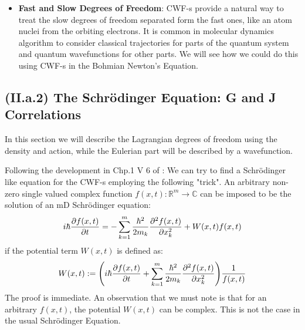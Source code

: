 \documentclass[11pt, a4paper]{article} %
\newcommand{\R}{\mathbb{R}} %
\newcommand{\C}{\mathbb{C}}
\begin{document}
\begin{itemize}
\item {\bf Fast and Slow Degrees of Freedom}: CWF-s provide a natural way to treat the slow degrees of freedom separated form the fast ones, like an atom nuclei from the orbiting electrons. It is common in molecular dynamics algorithm to consider classical trajectories for parts of the quantum system and quantum wavefunctions for other parts. We will see how we could do this using CWF-s in the Bohmian Newton's Equation.
\end{itemize}




\subsection*{(II.a.2) The Schrödinger Equation: G and J Correlations}
In this section we will describe the Lagrangian degrees of freedom using the density and action, while the Eulerian part will be described by a wavefunction. 

Following the development in Chp.1 V 6 of \cite{JordiXO}: We can try to find a Schrödinger like equation for the CWF-s employing the following "trick". An arbitrary non-zero single valued complex function $f(x, t):\R^m \rightarrow \C$ can be imposed to be the solution of an mD Schrödinger equation:\vspace{-0.3cm}
$$
i \hbar \pdv{f(x,t)}{t} = -\sum_{k=1}^m\frac{\hbar^2}{2 m_k}\pdv[2]{f(x,t)}{x_k} + W(x,t) f(x,t)
$$
if the potential term $W(x, t)$ is defined as:\vspace{-0.3cm}
$$
W(x, t) := \qty(i \hbar \pdv{f(x,t)}{t} +\sum_{k=1}^m\frac{\hbar^2}{2 m_k}\pdv[2]{f(x,t)}{x_k} ) \frac{1}{f(x,t)}\vspace{-0.3cm}
$$
The proof is immediate. An observation that we must note is that for an arbitrary $f(x,t)$, the potential $W(x,t)$ can be complex. This is not the case in the usual Schrödinger Equation.
\end{document}
